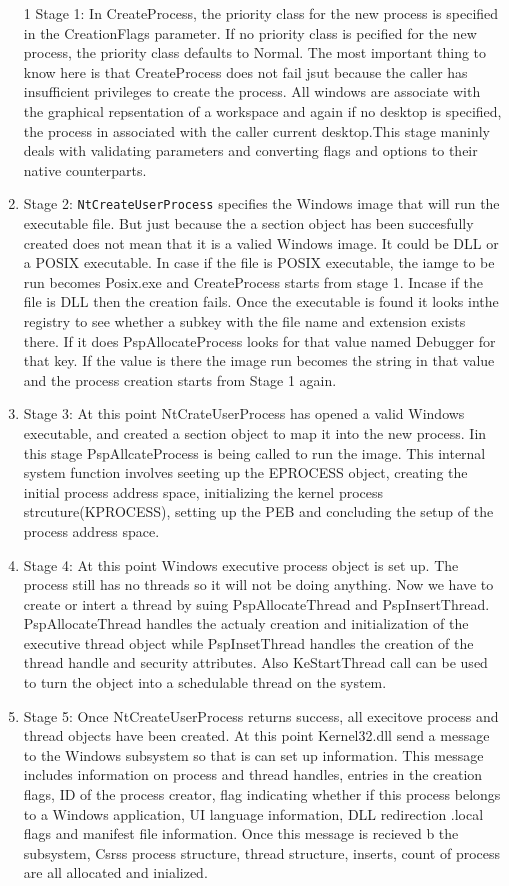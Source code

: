 \documentclass[letterpaper,10pt,draftclsnofoot,onecolumn]{IEEEtran}
\begin{document}
\begin{enumerate}
\item [1]Stage 1: In CreateProcess, the priority class for the new process is specified in the CreationFlags parameter. If no priority class is pecified for the new process, the priority class defaults to Normal. The most important thing to know here is that CreateProcess does not fail jsut because the caller has insufficient privileges to create the process. All windows are associate with the graphical repsentation of a workspace and again if no desktop is specified, the process in associated with the caller current desktop.This stage maninly deals with validating parameters and converting flags and options to their native counterparts.
\item Stage 2: \verb|NtCreateUserProcess| specifies the Windows image that will run the executable file. But just because the a section object has been succesfully created does not mean that it is a valied Windows image. It could be DLL or a POSIX executable. In case if the file is POSIX executable, the iamge to be run becomes Posix.exe and CreateProcess starts from stage 1. Incase if the file is DLL then the creation fails. Once the executable is found it looks inthe registry to see whether a subkey with the file name and extension exists there. If it does PspAllocateProcess looks for that value named Debugger for that key. If the value is there the image run becomes the string in that value and the process creation starts from Stage 1 again.
\item Stage 3: At this point NtCrateUserProcess has opened a valid Windows executable, and created a section object to map it into the new process. Iin this stage PspAllcateProcess is being called to run the image. This internal system function involves seeting up the EPROCESS object, creating the initial process address space, initializing the kernel process strcuture(KPROCESS), setting up the PEB and concluding the setup of the process address space.
\item Stage 4: At this point Windows executive process object is set up. The process still has no threads so it will not be doing anything. Now we have to create or intert a thread by suing PspAllocateThread and PspInsertThread. PspAllocateThread handles the actualy creation and initialization of the executive thread object while PspInsetThread handles the creation of the thread handle and security attributes. Also KeStartThread call can be used to turn the object into a schedulable thread on the system.
\item Stage 5: Once NtCreateUserProcess returns success, all execitove process and thread objects have been created. At this point Kernel32.dll send a message to the Windows subsystem so that is can set up information. This message includes information on process and thread handles, entries in the creation flags, ID of the process creator, flag indicating whether if this process belongs to a Windows application, UI language information, DLL redirection .local flags and manifest file information. Once this message is recieved b the subsystem, Csrss process structure, thread structure, inserts, count of process are all allocated and inialized.

\end{enumerate}
\end{document}
